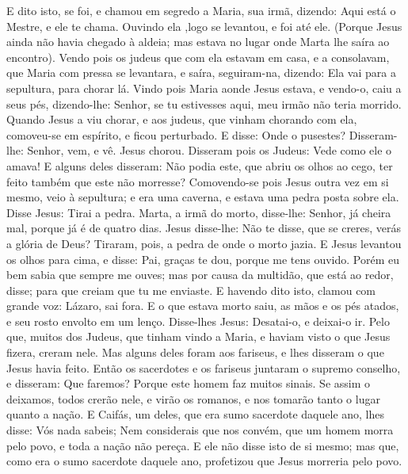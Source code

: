 {E dito isto,
{} se foi, e chamou em segredo a Maria, sua irmã, dizendo: Aqui está o Mestre, e ele te chama.
Ouvindo ela
{} ,logo se levantou, e foi até ele.
(Porque Jesus ainda não havia chegado à aldeia; mas estava no lugar onde Marta lhe saíra ao encontro).
Vendo pois os judeus que com ela estavam em casa, e a consolavam, que Maria com pressa se levantara, e saíra, seguiram-na, dizendo: Ela vai para a sepultura, para chorar lá.
Vindo pois Maria aonde Jesus estava, e vendo-o, caiu a seus pés, dizendo-lhe: Senhor, se tu estivesses aqui, meu irmão não teria morrido.
Quando Jesus a viu chorar, e aos judeus, que vinham chorando com ela, comoveu-se em espírito, e ficou perturbado.
E disse: Onde o pusestes? Disseram-lhe: Senhor, vem, e vê.
Jesus chorou.
Disseram pois os Judeus: Vede como ele o amava!
E alguns deles disseram: Não podia este, que abriu os olhos ao cego, ter feito também que este não morresse?
Comovendo-se pois Jesus outra vez em si mesmo, veio à sepultura; e era
{} uma caverna, e estava uma pedra posta sobre ela.
Disse Jesus: Tirai a pedra. Marta, a irmã do morto, disse-lhe: Senhor, já cheira mal, porque já é de quatro dias.
Jesus disse-lhe: Não te disse, que se creres, verás a glória de Deus?
Tiraram, pois, a pedra de onde o morto jazia. E Jesus levantou os olhos para cima, e disse: Pai, graças te dou, porque me tens ouvido.
Porém eu bem sabia que sempre me ouves; mas por causa da multidão, que está ao redor,
{} disse; para que creiam que tu me enviaste.
E havendo dito isto, clamou com grande voz: Lázaro, sai fora.
E o que estava morto saiu,
{} as mãos e os pés atados, e seu rosto envolto em um lenço. Disse-lhes Jesus: Desatai-o, e deixai-o ir.
Pelo que, muitos dos Judeus, que tinham vindo a Maria, e haviam visto o que Jesus fizera, creram nele.
Mas alguns deles foram aos fariseus, e lhes disseram o que Jesus havia feito.
Então os sacerdotes e os fariseus juntaram o supremo conselho,
 e disseram: Que faremos? Porque este homem faz muitos sinais.
Se assim o deixamos, todos crerão nele, e virão os romanos, e nos tomarão tanto o lugar quanto a nação.
E Caifás, um deles, que era sumo sacerdote daquele ano, lhes disse: Vós nada sabeis;
Nem considerais que nos convém, que um homem morra pelo povo, e toda a nação não pereça.
E ele não disse isto de si mesmo; mas que, como era o sumo sacerdote daquele ano, profetizou que Jesus morreria pelo povo.
}
